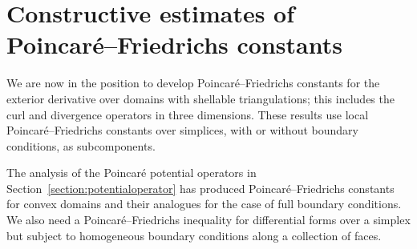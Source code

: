 \documentclass[10pt,a4paper]{article}
\begin{document}
        
        
        
        
        
        
        
        








\section{Constructive estimates of Poincar\'e--Friedrichs constants}\label{section:poincarefriedrichs}

We are now in the position to develop Poincar\'e--Friedrichs constants for the exterior derivative over domains with shellable triangulations; this includes the curl and divergence operators in three dimensions. 
These results use local Poincar\'e--Friedrichs constants over simplices, 
with or without boundary conditions, as subcomponents. 

The analysis of the Poincar\'e potential operators in Section~\ref{section:potentialoperator} has produced Poincar\'e--Friedrichs constants for convex domains and their analogues for the case of full boundary conditions. 
We also need a Poincar\'e--Friedrichs inequality for differential forms over a simplex but subject to homogeneous boundary conditions along a collection of faces. 
\end{document}
